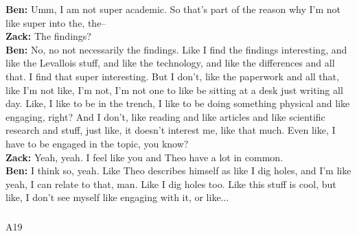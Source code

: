 \documentclass[
]{article}
\makeatletter
\let\oldsubparagraph\subparagraph
\renewcommand{\subparagraph}{
    \@ifstar
      \xxxSubParagraphStar
      \xxxSubParagraphNoStar
  }
\newcommand{\xxxSubParagraphStar}[1]{\oldsubparagraph*{#1}\mbox{}}
\newcommand{\xxxSubParagraphNoStar}[1]{\oldsubparagraph{#1}\mbox{}}
\makeatother
\begin{document}
\textbf{Ben:} Umm, I am not super academic. So that's part of the reason
why I'm not like super into the, the--\\
\textbf{Zack:} The findings?\\
\textbf{Ben:} No, no not necessarily the findings. Like I find the
findings interesting, and like the Levallois stuff, and like the
technology, and like the differences and all that. I find that super
interesting. But I don't, like the paperwork and all that, like I'm not
like, I'm not, I'm not one to like be sitting at a desk just writing all
day. Like, I like to be in the trench, I like to be doing something
physical and like engaging, right? And I don't, like reading and like
articles and like scientific research and stuff, just like, it doesn't
interest me, like that much. Even like, I have to be engaged in the
topic, you know?\\
\textbf{Zack:} Yeah, yeah. I feel like you and Theo have a lot in
common.\\
\textbf{Ben:} I think so, yeah. Like Theo describes himself as like I
dig holes, and I'm like yeah, I can relate to that, man. Like I dig
holes too. Like this stuff is cool, but like, I don't see myself like
engaging with it, or like...

\subparagraph{A19}\label{sec-A19}
\end{document}
